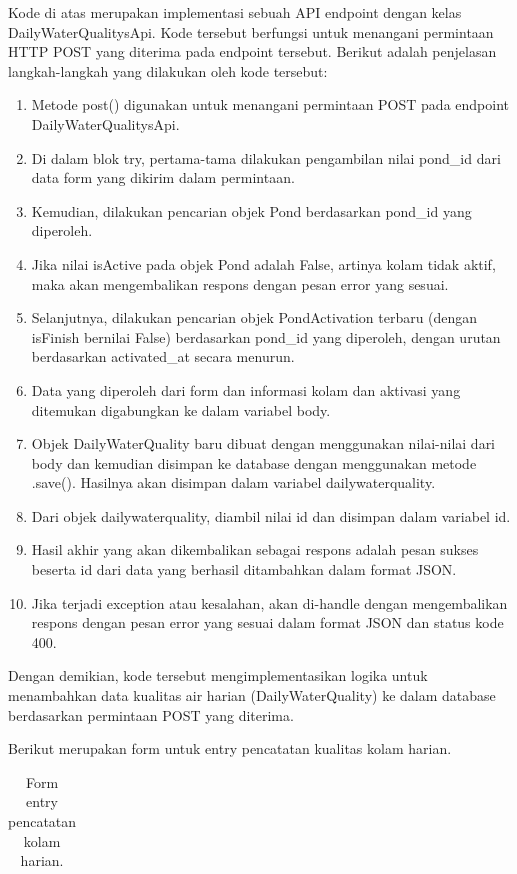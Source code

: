 \begin{enumerate}[1.]
Kode di atas merupakan implementasi sebuah API endpoint dengan kelas DailyWaterQualitysApi. Kode tersebut berfungsi untuk menangani permintaan HTTP POST yang diterima pada endpoint tersebut. Berikut adalah penjelasan langkah-langkah yang dilakukan oleh kode tersebut:

\begin{enumerate}
\item Metode post() digunakan untuk menangani permintaan POST pada endpoint DailyWaterQualitysApi.
\item Di dalam blok try, pertama-tama dilakukan pengambilan nilai pond\_id dari data form yang dikirim dalam permintaan.
\item Kemudian, dilakukan pencarian objek Pond berdasarkan pond\_id yang diperoleh.
\item Jika nilai isActive pada objek Pond adalah False, artinya kolam tidak aktif, maka akan mengembalikan respons dengan pesan error yang sesuai.
\item Selanjutnya, dilakukan pencarian objek PondActivation terbaru (dengan isFinish bernilai False) berdasarkan pond\_id yang diperoleh, dengan urutan berdasarkan activated\_at secara menurun.
\item Data yang diperoleh dari form dan informasi kolam dan aktivasi yang ditemukan digabungkan ke dalam variabel body.
\item Objek DailyWaterQuality baru dibuat dengan menggunakan nilai-nilai dari body dan kemudian disimpan ke database dengan menggunakan metode .save(). Hasilnya akan disimpan dalam variabel dailywaterquality.
\item Dari objek dailywaterquality, diambil nilai id dan disimpan dalam variabel id.
\item Hasil akhir yang akan dikembalikan sebagai respons adalah pesan sukses beserta id dari data yang berhasil ditambahkan dalam format JSON.
\item Jika terjadi exception atau kesalahan, akan di-handle dengan mengembalikan respons dengan pesan error yang sesuai dalam format JSON dan status kode 400.
\end{enumerate}
Dengan demikian, kode tersebut mengimplementasikan logika untuk menambahkan data kualitas air harian (DailyWaterQuality) ke dalam database berdasarkan permintaan POST yang diterima.

Berikut merupakan form untuk entry pencatatan kualitas kolam harian.

\begin{longtable}{| l | p{5cm} | p{5cm} |}
\caption{Form entry pencatatan kolam harian.\label{table:form_entry_pencatatan_kolam_harian}}\\


\end{longtable}
\end{enumerate}
